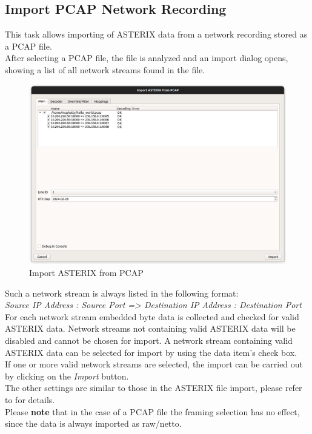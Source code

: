 \subsection{Import PCAP Network Recording}
\label{sec:ui_import_pcap}

This task allows importing of ASTERIX data from a network recording stored as a PCAP file. \\

After selecting a PCAP file, the file is analyzed and an import dialog opens, showing a list of all network streams
found in the file. 

\begin{figure}[H]
    \center
      \hspace*{-0.5cm}
      \includegraphics[width=17cm]{figures/asterix_import_pcap.png}
    \caption{Import ASTERIX from PCAP}
  \end{figure}

Such a network stream is always listed in the following format: \\

\textit{Source IP Address : Source Port => Destination IP Address : Destination Port} \\

For each network stream embedded byte data is collected and checked for valid ASTERIX data.
Network streams not containing valid ASTERIX data will be disabled and cannot be chosen for import.
A network stream containing valid ASTERIX data can be selected for import by using the data item's check box. \\

If one or more valid network streams are selected, the import can be carried out by clicking on the \textit{Import} button. \\

The other settings are similar to those in the ASTERIX file import, please refer to  for details. \\

Please \textbf{note} that in the case of a PCAP file the framing selection has no effect, since the data is always imported as raw/netto.

